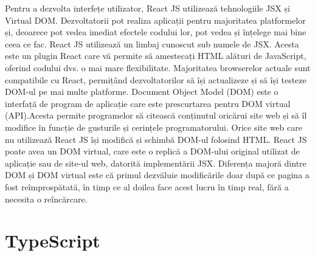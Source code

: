 \par Pentru a dezvolta interfețe utilizator, React JS utilizează tehnologiile JSX și Virtual DOM. Dezvoltatorii pot realiza aplicații pentru majoritatea platformelor și, deoarece pot vedea imediat efectele codului lor, pot vedea și înțelege mai bine ceea ce fac. React JS utilizează un limbaj cunoscut sub numele de JSX. Acesta este un plugin React care vă permite să amestecați HTML alături de JavaScript, oferind codului dvs. o mai mare flexibilitate. Majoritatea browserelor actuale sunt compatibile cu React, permițând dezvoltatorilor să își actualizeze și să își testeze DOM-ul pe mai multe platforme. Document Object Model (DOM) este o interfață de program de aplicație care este prescurtarea pentru DOM virtual (API).Acesta permite programelor să citească conținutul oricărui site web și să îl modifice în funcție de gusturile și cerințele programatorului. Orice site web care nu utilizează React JS își modifică și schimbă DOM-ul folosind HTML.
React JS poate avea un DOM virtual, care este o replică a DOM-ului original utilizat de aplicație sau de site-ul web, datorită implementării JSX. Diferența majoră dintre DOM și DOM virtual este că primul dezvăluie modificările doar după ce pagina a fost reîmprospătată, în timp ce al doilea face acest lucru în timp real, fără a necesita o reîncărcare.

\section{TypeScript}
\label{sec:ch4sec2}


